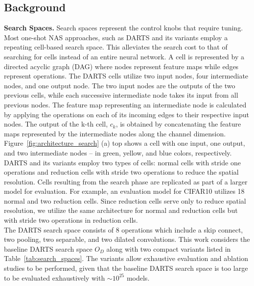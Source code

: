 \documentclass[onecolumn]{IEEEtran}
\begin{document}
\subsection{Background}
\textbf{Search Spaces.} Search spaces represent the control knobs that require tuning. Most one-shot NAS approaches, such as DARTS \cite{Liu2018} and its variants \cite{Wang2021, Zela2019} employ a repeating cell-based search space. This alleviates the search cost to that of searching for cells instead of an entire neural network. A cell is represented by a directed acyclic graph (DAG) where nodes represent feature maps while edges represent operations. The DARTS cells utilize two input nodes, four intermediate nodes, and one output node. The two input nodes are the outputs of the two previous cells, while each successive intermediate node takes its input from all previous nodes. The feature map representing an intermediate node is calculated by applying the operations on each of its incoming edges to their respective input nodes. The output of the k-th cell, \( c_k \), is obtained by concatenating the feature maps represented by the intermediate nodes along the channel dimension. Figure~\ref{fig:architecture_search} (a) top shows a cell with one input, one output, and two intermediate nodes – in green, yellow, and blue colors, respectively. DARTS and its variants employ two types of cells: normal cells with stride one operations and reduction cells with stride two operations to reduce the spatial resolution. Cells resulting from the search phase are replicated as part of a larger model for evaluation. For example, an evaluation model for CIFAR10 utilizes 18 normal and two reduction cells. Since reduction cells serve only to reduce spatial resolution, we utilize the same architecture for normal and reduction cells but with stride two operations in reduction cells. \\
The DARTS search space consists of 8 operations which include a skip connect, two pooling, two separable, and two dilated convolutions. This work considers the baseline DARTS search space \( O_D \) along with two compact variants listed in Table~\ref{tab:search_spaces}. The variants allow exhaustive evaluation and ablation studies to be performed, given that the baseline DARTS search space is too large to be evaluated exhaustively with \(\sim 10^{25}\) models.
\end{document}
